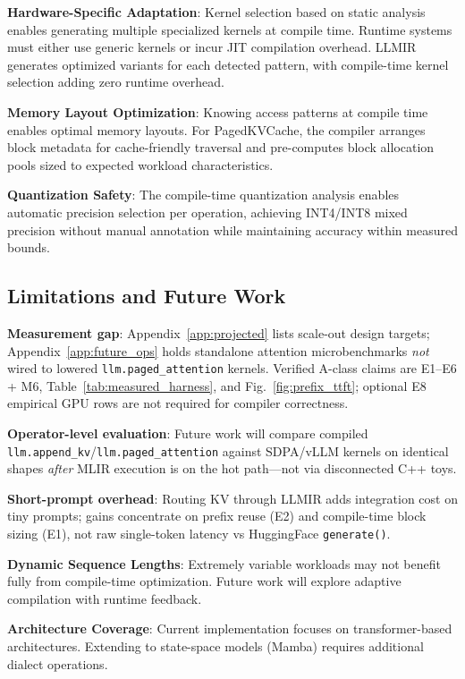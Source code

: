 \documentclass[conference]{IEEEtran}
\begin{document}
\textbf{Hardware-Specific Adaptation}: Kernel selection based on static analysis enables generating multiple specialized kernels at compile time. Runtime systems must either use generic kernels or incur JIT compilation overhead. LLMIR generates optimized variants for each detected pattern, with compile-time kernel selection adding zero runtime overhead.

\textbf{Memory Layout Optimization}: Knowing access patterns at compile time enables optimal memory layouts. For PagedKVCache, the compiler arranges block metadata for cache-friendly traversal and pre-computes block allocation pools sized to expected workload characteristics.

\textbf{Quantization Safety}: The compile-time quantization analysis enables automatic precision selection per operation, achieving INT4/INT8 mixed precision without manual annotation while maintaining accuracy within measured bounds.

\subsection{Limitations and Future Work}

\textbf{Measurement gap}: Appendix~\ref{app:projected} lists scale-out design targets; Appendix~\ref{app:future_ops} holds standalone attention microbenchmarks \emph{not} wired to lowered \texttt{llm.paged\_attention} kernels. Verified A-class claims are E1--E6 + M6, Table~\ref{tab:measured_harness}, and Fig.~\ref{fig:prefix_ttft}; optional E8 empirical GPU rows are not required for compiler correctness.

\textbf{Operator-level evaluation}: Future work will compare compiled \texttt{llm.append\_kv}/\texttt{llm.paged\_attention} against SDPA/vLLM kernels on identical shapes \emph{after} MLIR execution is on the hot path---not via disconnected C++ toys.

\textbf{Short-prompt overhead}: Routing KV through LLMIR adds integration cost on tiny prompts; gains concentrate on prefix reuse (E2) and compile-time block sizing (E1), not raw single-token latency vs HuggingFace \texttt{generate()}.

\textbf{Dynamic Sequence Lengths}: Extremely variable workloads may not benefit fully from compile-time optimization. Future work will explore adaptive compilation with runtime feedback.

\textbf{Architecture Coverage}: Current implementation focuses on transformer-based architectures. Extending to state-space models (Mamba) requires additional dialect operations.
\end{document}
